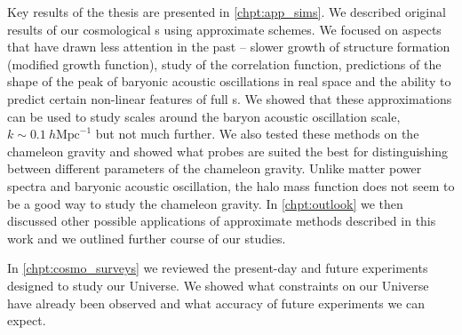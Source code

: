 Key results of the thesis are presented in \autoref{chpt:app_sims}. We described original results of our cosmological \nbodysim s using approximate schemes. We focused on aspects that have drawn less attention in the past -- slower growth of structure formation (modified growth function), study of the correlation function, predictions of the shape of the peak of baryonic acoustic oscillations in real space and the ability to predict certain non-linear features of full \nbodysim s. We showed that these approximations can be used to study scales around the baryon acoustic oscillation scale, $k\sim 0.1~h\text{Mpc}^{-1}$ but not much further. We also tested these methods on the chameleon gravity and showed what probes are suited the best for distinguishing between different parameters of the chameleon gravity. Unlike matter power spectra and baryonic acoustic oscillation, the halo mass function does not seem to be a good way to study the chameleon gravity. In \autoref{chpt:outlook} we then discussed other possible applications of approximate methods described in this work and we outlined further course of our studies.

In \autoref{chpt:cosmo_surveys} we reviewed the present-day and future experiments designed to study our Universe. We showed what constraints on our Universe have already been observed and what accuracy of future experiments we can expect.


